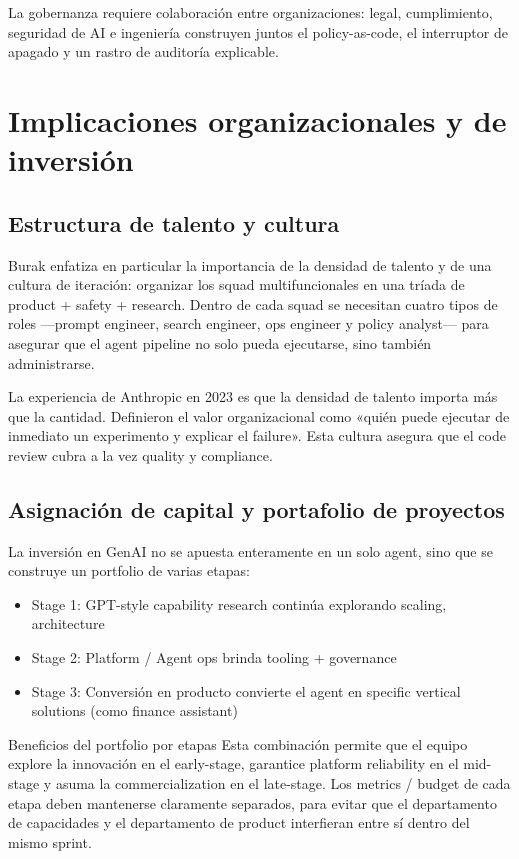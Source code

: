 \documentclass[a4paper]{article}
\begin{document}
La gobernanza requiere colaboración entre organizaciones: legal, cumplimiento, seguridad de AI e ingeniería construyen juntos el policy-as-code, el interruptor de apagado y un rastro de auditoría explicable.

\section{Implicaciones organizacionales y de inversión}

\subsection{Estructura de talento y cultura}

Burak enfatiza en particular la importancia de la densidad de talento y de una cultura de iteración: organizar los squad multifuncionales en una tríada de product + safety + research. Dentro de cada squad se necesitan cuatro tipos de roles —prompt engineer, search engineer, ops engineer y policy analyst— para asegurar que el agent pipeline no solo pueda ejecutarse, sino también administrarse.

La experiencia de Anthropic en 2023 es que la densidad de talento importa más que la cantidad. Definieron el valor organizacional como «quién puede ejecutar de inmediato un experimento y explicar el failure». Esta cultura asegura que el code review cubra a la vez quality y compliance.

\subsection{Asignación de capital y portafolio de proyectos}

La inversión en GenAI no se apuesta enteramente en un solo agent, sino que se construye un portfolio de varias etapas:

\begin{itemize}
    \item Stage 1: GPT-style capability research continúa explorando scaling, architecture
    \item Stage 2: Platform / Agent ops brinda tooling + governance
    \item Stage 3: Conversión en producto convierte el agent en specific vertical solutions (como finance assistant)
\end{itemize}

\begin{importantbox}{Beneficios del portfolio por etapas}
Esta combinación permite que el equipo explore la innovación en el early-stage, garantice platform reliability en el mid-stage y asuma la commercialization en el late-stage. Los metrics / budget de cada etapa deben mantenerse claramente separados, para evitar que el departamento de capacidades y el departamento de product interfieran entre sí dentro del mismo sprint.
\end{importantbox}
\end{document}

